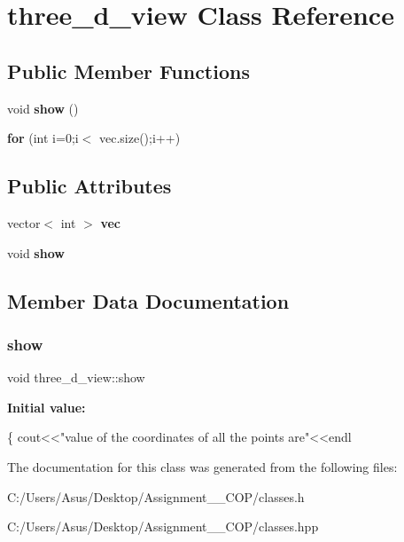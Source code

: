 \hypertarget{classthree__d__view}{}\section{three\+\_\+d\+\_\+view Class Reference}
\label{classthree__d__view}
\subsection*{Public Member Functions}
\begin{DoxyCompactItemize}
\item 
\mbox{\label{classthree__d__view_abb970c9036bb70e1bfa0caed96eadc75}} 
void {\bfseries show} ()
\item 
\mbox{\label{classthree__d__view_a21f8f42e204b6dae273c59c2ae8315c3}} 
{\bfseries for} (int i=0;i$<$ vec.\+size();i++)
\end{DoxyCompactItemize}
\subsection*{Public Attributes}
\begin{DoxyCompactItemize}
\item 
\mbox{\label{classthree__d__view_a531fc0f716f1eba52ecfad61b71fff57}} 
vector$<$ int $>$ {\bfseries vec}
\item 
void {\bfseries show}
\end{DoxyCompactItemize}


\subsection{Member Data Documentation}
\mbox{\label{classthree__d__view_a62e2d122b530cdcd1c511b7a839601cf}} 
\subsubsection{\texorpdfstring{show}{show}}
{\footnotesize\ttfamily void three\+\_\+d\+\_\+view\+::show}

{\bfseries Initial value\+:}
\begin{DoxyCode}
\{
    cout<<\textcolor{stringliteral}{"value of the coordinates of all the points are"}<<endl
\end{DoxyCode}


The documentation for this class was generated from the following files\+:\begin{DoxyCompactItemize}
\item 
C\+:/\+Users/\+Asus/\+Desktop/\+Assignment\+\_\+\_\+\+C\+O\+P/classes.\+h\item 
C\+:/\+Users/\+Asus/\+Desktop/\+Assignment\+\_\+\_\+\+C\+O\+P/classes.\+hpp\end{DoxyCompactItemize}
